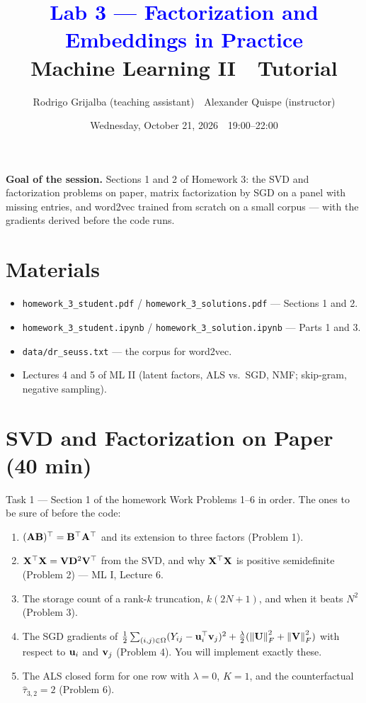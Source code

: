 \documentclass[11pt]{article}
\title{\textcolor{blue}{Lab 3 --- Factorization and Embeddings in Practice}\\[4pt]
\large Machine Learning II \,\textperiodcentered\, Tutorial}
\author{Rodrigo Grijalba (teaching assistant) \,\textperiodcentered\, Alexander Quispe (instructor)}
\date{Wednesday, October 21, 2026 \,\textperiodcentered\, 19:00--22:00}
\begin{document}
\maketitle

\begin{keypoint}
\textbf{Goal of the session.} Sections 1 and 2 of Homework 3: the SVD and factorization problems on paper,
matrix factorization by SGD on a panel with missing entries, and word2vec trained from scratch on a small
corpus --- with the gradients derived before the code runs.
\end{keypoint}

\section*{Materials}
\begin{itemize}[nosep]
  \item \texttt{homework\_3\_student.pdf} / \texttt{homework\_3\_solutions.pdf} --- Sections 1 and 2.
  \item \texttt{homework\_3\_student.ipynb} / \texttt{homework\_3\_solution.ipynb} --- Parts 1 and 3.
  \item \texttt{data/dr\_seuss.txt} --- the corpus for word2vec.
  \item Lectures 4 and 5 of ML II (latent factors, ALS vs.\ SGD, NMF; skip-gram, negative sampling).
\end{itemize}

\section{SVD and Factorization on Paper (40 min)}
\begin{task}{Task 1 --- Section 1 of the homework}
Work Problems 1--6 in order. The ones to be sure of before the code:
\begin{enumerate}[nosep]
  \item $(\mathbf{A}\mathbf{B})^{\top}=\mathbf{B}^{\top}\mathbf{A}^{\top}$ and its extension to three factors (Problem 1).
  \item $\mathbf{X}^{\top}\mathbf{X}=\mathbf{V}\mathbf{D}^2\mathbf{V}^{\top}$ from the SVD, and why $\mathbf{X}^{\top}\mathbf{X}$ is positive semidefinite (Problem 2) --- ML I, Lecture 6.
  \item The storage count of a rank-$k$ truncation, $k(2N+1)$, and when it beats $N^2$ (Problem 3).
  \item The SGD gradients of $\tfrac12\sum_{(i,j)\in\Omega}(Y_{ij}-\mathbf{u}_i^{\top}\mathbf{v}_j)^2+\tfrac\lambda2(\left\lVert \mathbf{U} \right\rVert_F^2+\left\lVert \mathbf{V} \right\rVert_F^2)$
        with respect to $\mathbf{u}_i$ and $\mathbf{v}_j$ (Problem 4). You will implement exactly these.
  \item The ALS closed form for one row with $\lambda=0$, $K=1$, and the counterfactual $\hat\tau_{3,2}=2$ (Problem 6).
\end{enumerate}
\end{task}
\end{document}
